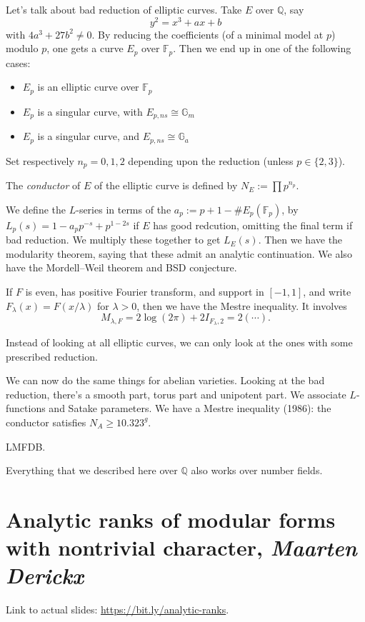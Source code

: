 \documentclass[reqno]{amsart} 
\begin{document}
Let's talk about bad reduction of elliptic curves.  Take $E$ over $\mathbb{Q}$, say
\begin{equation*}
  y^2 = x^3 + a x + b
\end{equation*}
with $4 a^3 + 27 b^2 \neq 0$.  By reducing the coefficients (of a minimal model at $p$) modulo $p$, one gets a curve $E_p$ over $\mathbb{F}_p$.  Then we end up in one of the following cases:
\begin{itemize}
\item $E_p$ is an elliptic curve over $\mathbb{F}_p$
\item $E_p$ is a singular curve, with $E_{p, n s} \cong \mathbb{G}_m$
\item $E_p$ is a singular curve, and $E_{p, ns} \cong \mathbb{G}_a$
\end{itemize}
Set respectively $n_p = 0, 1, 2$ depending upon the reduction (unless $p \in \{2,3\}$).

The \emph{conductor} of $E$ of the elliptic curve is defined by $N_E := \prod p^{n_p}$.

We define the $L$-series in terms of the $a_p := p + 1 - \# E_p(\mathbb{F}_p)$, by $L_p(s) = 1 - a_p p^{- s} + p^{1 - 2 s}$ if $E$ has good redcution, omitting the final term if bad reduction.  We multiply these together to get $L_E(s)$.  Then we have the modularity theorem, saying that these admit an analytic continuation.  We also have the Mordell--Weil theorem and BSD conjecture.

If $F$ is even, has positive Fourier transform, and support in $[-1, 1]$, and write $F_\lambda(x) = F(x / \lambda)$ for $\lambda > 0$, then we have the Mestre inequality.  It involves
\begin{equation*}
  M_{\lambda, F} = 2 \log(2 \pi) + 2 I_{F_\lambda, 2} = 2 \left( \dotsb \right).
\end{equation*}

Instead of looking at all elliptic curves, we can only look at the ones with some prescribed reduction.

We can now do the same things for abelian varieties.  Looking at the bad reduction, there's a smooth part, torus part and unipotent part.  We associate $L$-functions and Satake parameters.  We have a Mestre inequality (1986): the conductor satisfies $N_A \geq 10.323^g$.

LMFDB.

Everything that we described here over $\mathbb{Q}$ also works over number fields.

\section{Analytic ranks of modular forms with nontrivial character, \textnormal{\emph{Maarten Derickx}}}
Link to actual slides: \url{https://bit.ly/analytic-ranks}.
\end{document}
